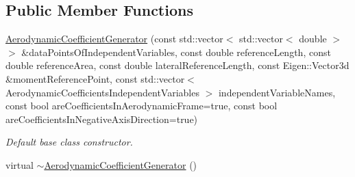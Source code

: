 \subsection*{Public Member Functions}
\begin{DoxyCompactItemize}
\item 
\hyperlink{classtudat_1_1aerodynamics_1_1AerodynamicCoefficientGenerator_a469808ab7a0fe9491562b8f46fe3c0c6}{Aerodynamic\+Coefficient\+Generator} (const std\+::vector$<$ std\+::vector$<$ double $>$ $>$ \&data\+Points\+Of\+Independent\+Variables, const double reference\+Length, const double reference\+Area, const double lateral\+Reference\+Length, const Eigen\+::\+Vector3d \&moment\+Reference\+Point, const std\+::vector$<$ Aerodynamic\+Coefficients\+Independent\+Variables $>$ independent\+Variable\+Names, const bool are\+Coefficients\+In\+Aerodynamic\+Frame=true, const bool are\+Coefficients\+In\+Negative\+Axis\+Direction=true)
\begin{DoxyCompactList}\small\item\em Default base class constructor. \end{DoxyCompactList}\item 
virtual \hyperlink{classtudat_1_1aerodynamics_1_1AerodynamicCoefficientGenerator_a3d460a387284388a7c0cb2517288df5c}{$\sim$\+Aerodynamic\+Coefficient\+Generator} ()\hypertarget{classtudat_1_1aerodynamics_1_1AerodynamicCoefficientGenerator_a3d460a387284388a7c0cb2517288df5c}{}\label{classtudat_1_1aerodynamics_1_1AerodynamicCoefficientGenerator_a3d460a387284388a7c0cb2517288df5c}


\end{DoxyCompactItemize}
